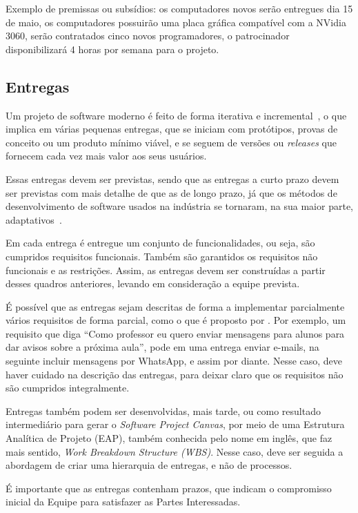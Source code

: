\documentclass[fontsize=12pt, a4paper,pagesize=auto,toc=listof, ,twoside,chapterprefix=false,appendixprefix=true,open=right]{scrbook}
\begin{document}
Exemplo de premissas ou subsídios: os computadores novos serão entregues dia 15 de maio, os computadores possuirão uma placa gráfica compatível com a NVidia 3060, serão contratados cinco novos programadores, o patrocinador disponibilizará 4 horas por semana para o projeto.

\subsection{Entregas}

Um projeto de software moderno é feito de forma iterativa e incremental~\citep{pressman:2019,essential:scrum}, o que implica em várias pequenas entregas, que se iniciam com protótipos, provas de conceito ou um produto mínimo viável, e se seguem de versões ou \textit{releases} que fornecem cada vez mais valor aos seus usuários.

Essas entregas devem ser previstas, sendo que as entregas a curto prazo devem ser previstas com mais detalhe de que as de longo prazo, já que os métodos de desenvolvimento de software usados na indústria se tornaram, na sua maior parte, adaptativos~\citep{agilestate15}.

Em cada entrega é entregue um conjunto de funcionalidades, ou seja, são cumpridos requisitos funcionais.
Também são garantidos os requisitos não funcionais e as restrições. Assim, as entregas devem ser construídas a partir desses quadros anteriores, levando em consideração a equipe prevista.

É possível que as entregas sejam descritas de forma a implementar parcialmente vários requisitos de forma parcial, como o que é proposto por \citet{jacobson:2011:uc2p0}.
Por exemplo, um requisito que diga ``Como professor eu quero enviar mensagens para alunos para dar avisos sobre a próxima aula'', pode em uma entrega enviar e-mails, na seguinte incluir mensagens por WhatsApp, e assim por diante.
 Nesse caso, deve haver cuidado na descrição das entregas, para deixar claro que os requisitos não são cumpridos integralmente.

Entregas também podem ser desenvolvidas, mais tarde, ou como resultado intermediário para gerar o \textit{Software Project Canvas}, por meio de uma Estrutura Analítica de Projeto (EAP), também conhecida pelo nome em inglês, que faz mais sentido, \textit{Work Breakdown Structure (WBS)}. Nesse caso, deve ser seguida a abordagem de criar uma hierarquia de entregas, e não de processos.

É importante que as entregas contenham prazos, que indicam o compromisso inicial da Equipe para satisfazer as Partes Interessadas.
\end{document}
